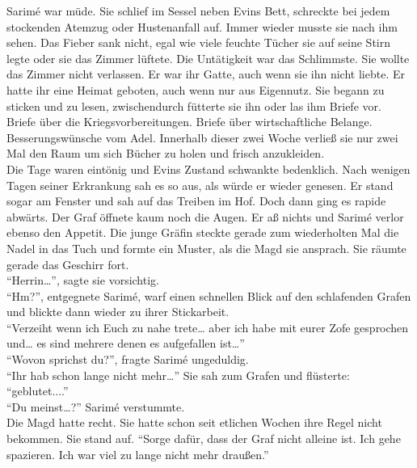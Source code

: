 Sarimé war müde. Sie schlief im Sessel neben Evins Bett, schreckte bei jedem stockenden Atemzug 
oder 
Hustenanfall auf. Immer wieder musste sie nach ihm sehen. Das Fieber sank nicht, egal wie viele 
feuchte Tücher sie auf seine Stirn legte oder sie das Zimmer lüftete. Die Untätigkeit war das 
Schlimmste. Sie wollte das Zimmer nicht verlassen. Er war ihr Gatte, auch wenn sie ihn nicht 
liebte. Er hatte ihr eine Heimat geboten, auch wenn nur aus Eigennutz. Sie begann zu sticken und zu 
lesen, zwischendurch fütterte sie ihn oder las ihm Briefe vor. Briefe über die 
Kriegsvorbereitungen. Briefe über wirtschaftliche Belange. Besserungswünsche vom Adel. Innerhalb 
dieser zwei Woche verließ sie nur zwei Mal den Raum um sich Bücher zu holen und frisch 
anzukleiden.\\
Die Tage waren eintönig und Evins Zustand schwankte bedenklich. Nach wenigen Tagen seiner 
Erkrankung 
sah es so aus, als würde er wieder genesen. Er stand sogar am Fenster und sah auf das Treiben im 
Hof. Doch dann ging es rapide abwärts. Der Graf öffnete kaum noch die Augen. Er aß nichts und 
Sarimé 
verlor ebenso den Appetit. Die junge Gräfin steckte gerade zum wiederholten Mal die Nadel in das 
Tuch und formte ein Muster, als die Magd sie ansprach. Sie räumte gerade das Geschirr fort. \\
``Herrin…'', sagte sie vorsichtig.\\
``Hm?'', entgegnete Sarimé, warf einen schnellen Blick auf den schlafenden Grafen und blickte dann 
wieder zu ihrer Stickarbeit.\\
``Verzeiht wenn ich Euch zu nahe trete… aber ich habe mit eurer Zofe gesprochen und… es sind 
mehrere 
denen es aufgefallen ist…''\\
``Wovon sprichst du?'', fragte Sarimé ungeduldig.\\
``Ihr hab schon lange nicht mehr…'' Sie sah zum Grafen und flüsterte: ``geblutet....''\\
``Du meinst…?'' Sarimé verstummte.\\
Die Magd hatte recht. Sie hatte schon seit etlichen Wochen ihre Regel nicht bekommen. Sie stand 
auf. 
``Sorge dafür, dass der Graf nicht alleine ist. Ich gehe spazieren. Ich war viel zu lange nicht 
mehr 
draußen.''\\

